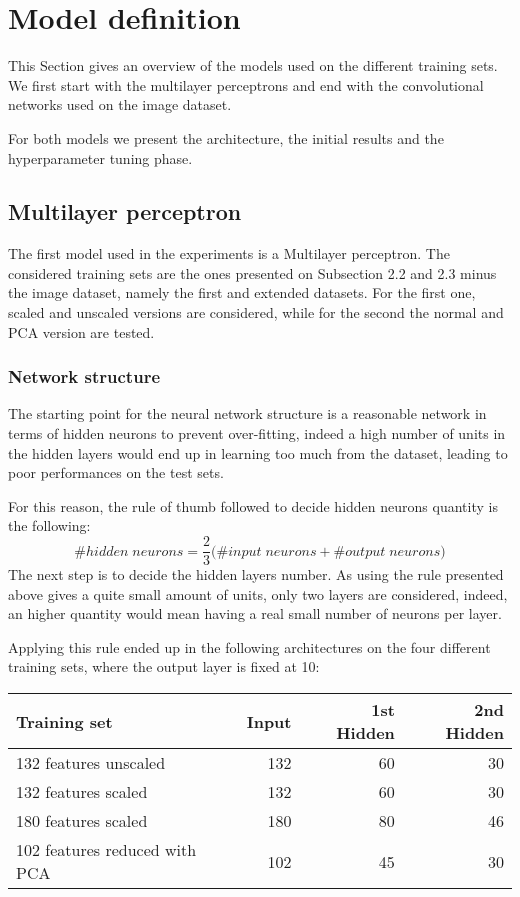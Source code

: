 \section{Model definition}
\label{model-definition}

This Section gives an overview of the models used on the different 
training sets. We first start with the multilayer perceptrons and 
end with the convolutional networks used on the image dataset.

For both models we present the architecture, the initial results 
and the hyperparameter tuning phase.

\subsection{Multilayer perceptron}

The first model used in the experiments is a Multilayer perceptron. 
The considered training sets are the ones presented on Subsection 2.2 and 2.3 minus the image 
dataset, 
namely the first and extended datasets. For the first one, scaled and unscaled 
versions are considered, while for the second the normal and PCA version are tested.

\subsubsection{Network structure}
The starting point for the neural network structure is a 
reasonable network in terms of hidden neurons to prevent over-fitting, 
indeed a high number of units in the hidden layers would end up in learning 
too much from the dataset, leading to poor performances on the test sets.

For this reason, the rule of thumb followed to decide hidden neurons quantity is the 
following: 
$$\#\mathit{hidden\; neurons} = \frac{2}{3}\big(\#\mathit{input\;neurons}
+ \#\mathit{output\;neurons}\big)$$
The next step is to decide the hidden layers number. As using the rule 
presented above gives a quite small amount of units, only two layers are considered,  
indeed, an higher quantity would mean having a real small number of neurons per layer.

Applying this rule ended up in the following architectures on the four 
different training sets, where the output layer is fixed at 10:
\begin{center}
    \begin{tabular}{ |l|r|r|r| } 
        \hline
        Training set & Input & 1st Hidden & 2nd Hidden  \\
        \hline
        132 features unscaled &  132 & 60 & 30 \\
        132 features scaled &  132 & 60 & 30 \\
        180 features scaled &  180 & 80 & 46 \\
        102 features reduced with PCA &  102 & 45 & 30 \\
        \hline
    \end{tabular}
\end{center}

